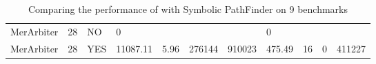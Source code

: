 \begin{table*}[]
\begin{tabular}{@{}lllllllllll@{}}
        MerArbiter                                               & 28                                                           & NO                                                                 & 0                                                               &                                                                          &                                                                &                                                               & 0                                                             &                                                                     &                                                                     &                                                             \\
        MerArbiter                                               & 28                                                           & YES                                                                & 11087.11                                                        & 5.96                                                                     & 276144                                                         & 910023                                                        & 475.49                                                        & 16                                                                  & 0                                                                   & 411227                                                      \\ \bottomrule
    \end{tabular}
    \caption{Comparing the performance of \tool with Symbolic PathFinder on 9 benchmarks}
    \label{table:results-all-mode5}
\end{table*}